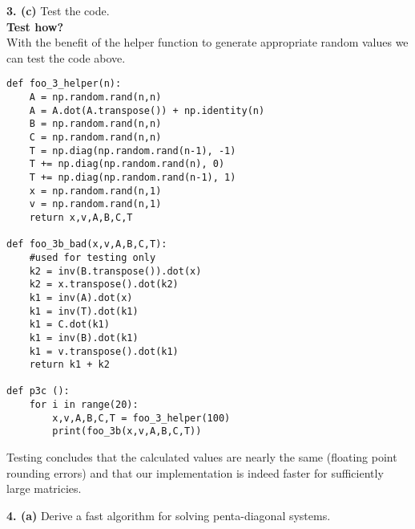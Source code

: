 \documentclass[12pt]{article}
\newcommand{\problem}[1]{\hspace{-4 ex} \large \textbf{#1}}
\begin{document}
\problem{3. (c)} Test the code. \\
	\textbf{Test how?}\\
	With the benefit of the helper function to generate appropriate random values we can test the code above.
	\begin{lstlisting}
def foo_3_helper(n):
	A = np.random.rand(n,n)
	A = A.dot(A.transpose()) + np.identity(n)
	B = np.random.rand(n,n)
	C = np.random.rand(n,n)
	T = np.diag(np.random.rand(n-1), -1) 
	T += np.diag(np.random.rand(n), 0) 
	T += np.diag(np.random.rand(n-1), 1)
	x = np.random.rand(n,1)
	v = np.random.rand(n,1)
	return x,v,A,B,C,T
		
def foo_3b_bad(x,v,A,B,C,T):
	#used for testing only
	k2 = inv(B.transpose()).dot(x)
	k2 = x.transpose().dot(k2)
	k1 = inv(A).dot(x)
	k1 = inv(T).dot(k1)
	k1 = C.dot(k1)
	k1 = inv(B).dot(k1)
	k1 = v.transpose().dot(k1)
	return k1 + k2
	
def p3c ():
	for i in range(20):
		x,v,A,B,C,T = foo_3_helper(100)
		print(foo_3b(x,v,A,B,C,T))
	\end{lstlisting}
	Testing concludes that the calculated values are nearly the same (floating point rounding errors) and that our implementation is indeed faster for sufficiently large matricies.
	
\problem{4. (a)} Derive a fast algorithm for solving penta-diagonal systems. \\
\end{document}
